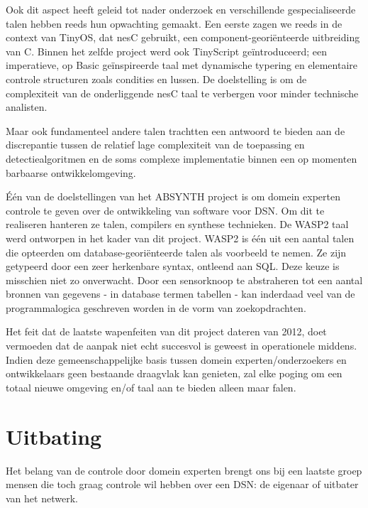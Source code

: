Ook dit aspect heeft geleid tot nader onderzoek en verschillende
gespecialiseerde talen hebben reeds hun opwachting gemaakt. Een eerste zagen we
reeds in de context van TinyOS, dat nesC \citep{gay2003nesc} gebruikt, een
component-geori\"enteerde uitbreiding van C. Binnen het zelfde project werd ook
TinyScript \citep{levis2004tinyscript} ge\"introduceerd; een imperatieve, op
Basic ge\"inspireerde taal met dynamische typering en elementaire controle
structuren zoals condities en lussen. De doelstelling is om de complexiteit van
de onderliggende nesC taal te verbergen voor minder technische analisten.

Maar ook fundamenteel andere talen trachtten een antwoord te bieden aan de
discrepantie tussen de relatief lage complexiteit van de toepassing en
detectiealgoritmen en de soms complexe implementatie binnen een op momenten
barbaarse ontwikkelomgeving.

\'E\'en van de doelstellingen van het ABSYNTH project \citep{url:absynth} is om
domein experten controle te geven over de ontwikkeling van software voor DSN.
Om dit te realiseren hanteren ze talen, compilers en synthese technieken. De
WASP2 taal \citep{bai2009archetype} werd ontworpen in het kader van dit
project. WASP2 is \'e\'en uit een aantal talen die opteerden om
database-geori\"enteerde talen als voorbeeld te nemen. Ze zijn getypeerd door
een zeer herkenbare syntax, ontleend aan SQL. Deze keuze is misschien niet zo
onverwacht. Door een sensorknoop te abstraheren tot een aantal bronnen van
gegevens - in database termen tabellen - kan inderdaad veel van de
programmalogica geschreven worden in de vorm van zoekopdrachten.

Het feit dat de laatste wapenfeiten van dit project dateren van 2012, doet
vermoeden dat de aanpak niet echt succesvol is geweest in operationele middens.
Indien deze gemeenschappelijke basis tussen domein experten/onderzoekers en
ontwikkelaars geen bestaande draagvlak kan genieten, zal elke poging om een
totaal nieuwe omgeving en/of taal aan te bieden alleen maar falen.

\section{Uitbating}
\label{section:problem-operations}

Het belang van de controle door domein experten brengt ons bij een laatste
groep mensen die toch graag controle wil hebben over een DSN: de eigenaar of
uitbater van het netwerk.

